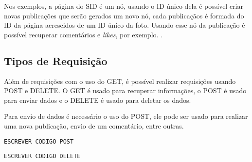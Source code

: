 Nos exemplos, a página do SID é um nó, usando o ID único dela é possível criar novas publicações que serão gerados um novo nó, cada publicaçãos é formada do ID da página acrescidos de um ID único da foto. Usando esse nó da publicação é possível recuperar comentários e \textit{likes}, por exemplo. \cite{facebook2018b}.

\subsection{Tipos de Requisição}
Além de requisições com o uso do GET, é possível realizar requisições usando POST e DELETE. O GET é usado para recuperar informações, o POST é usado para enviar dados e o DELETE é usado para deletar os dados.

Para envio de dados é necessário o uso do POST, ele pode ser usado para realizar uma nova publicação, envio de um comentário, entre outras.
\begin{lstlisting}[caption={Requsição de diversos atributos},label={lst:requisicao9}]
ESCREVER CODIGO POST
\end{lstlisting}

\begin{lstlisting}[caption={Requsição de diversos atributos},label={lst:requisicao10}]
ESCREVER CODIGO DELETE
\end{lstlisting}